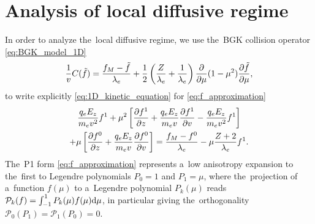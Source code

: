 \section{Analysis of local diffusive regime}
\label{app:DiffusiveKinetics}

In order to analyze the~local diffusive regime, 
we use the~BGK collision operator 
\eqref{eq:BGK_model_1D} 
\begin{equation}
  \frac{1}{v}C(\tilde{f})
  =
  \frac{f_M - \tilde{f}}{\lambda_e}
  + \frac{1}{2}\left(\frac{Z}{\lambda_e} + \frac{1}{\lambda_e}\right)
  \frac{\partial{}}{\partial{\mu}}(1 - \mu^2)\frac{\partial{\tilde{f}}}{\partial{\mu}} 
  ,\nonumber
\end{equation}
to write explicitly \eqref{eq:1D_kinetic_equation} 
for \eqref{eq:f_approximation} 
\begin{multline}
  \frac{q_eE_z}{m_ev^2} f^1 
  + \mu^2\left[\frac{\partial{f^1}}{\partial{z}} 
  + \frac{q_eE_z}{m_ev}\frac{\partial{f^1}}{\partial{v}} - \frac{q_eE_z}{m_ev^2} f^1
  \right] \\ 
  + \mu\left[\frac{\partial{f^0}}{\partial{z}} 
  + \frac{q_eE_z}{m_ev}\frac{\partial{f^0}}{\partial{v}}\right] = 
  \frac{f_M - f^0}{\lambda_e} - \mu \frac{Z + 2}{\lambda_e}f^1
  .
  \label{app_eq:BGK_model_1D}
\end{multline}
The~P1 form \eqref{eq:f_approximation} represents a~low anisotropy
expansion to the~first to Legendre polynomials $P_0 = 1$ and $P_1 = \mu$, 
where the~projection of a~function $f(\mu)$ 
to a~Legendre polynomial $P_k(\mu)$ reads
$\mathcal{P}_k(f) = \int_{-1}^1 P_k(\mu) f(\mu) \text{d}\mu$, in particular giving
the~orthogonality $\mathcal{P}_0(P_1) = \mathcal{P}_1(P_0) = 0$.

